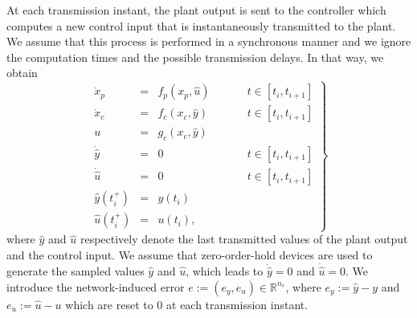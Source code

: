 \documentclass[a4paper, 9pt, twocolumn]{IEEEtran}
\theoremstyle{plain}
\theoremstyle{definition}
\newcommand{\R}[2]{\ensuremath{\mathbb{R}^{#1}_{#2}}}
\begin{document}
At each transmission instant, the plant output is sent to the controller which computes a new control input that is instantaneously transmitted to the plant. We assume that this process is performed in a synchronous manner and we ignore the computation times and the possible transmission delays. In that way, we obtain
\begin{equation}
\left.
  \begin{array}{rcll}
    \dot{x}_{p} &=& f_{p}(x_{p},\hat{u}) &\hspace{30pt}  t\in [t_{i}, t_{i+1}]\\
    \dot{x}_{c} &=& f_{c}(x_{c}, \hat{y}) &\hspace{30pt}  t\in [t_{i}, t_{i+1}]\\
    u &=& g_{c}(x_{c}, \hat{y}) \\
    \dot{\hat{y}} &=& 0 &\hspace{30pt}  t\in [t_{i}, t_{i+1}]\\
    \dot{\hat{u}} &=& 0 &\hspace{30pt}  t\in [t_{i}, t_{i+1}] \\
    \hat{y}(t_{i}^{+}) &=& y(t_{i}) \\
    \hat{u}(t_{i}^{+}) &=& u(t_{i}),
  \end{array}
\right \}
\end{equation}
\noindent where $\hat{y}$ and $\hat{u}$ respectively denote the last transmitted values of the plant output and the control input. We assume that zero-order-hold devices are used to generate the sampled values $\hat{y}$ and $\hat{u}$, which leads to  $\dot{\hat{y}} = 0$ and $\dot{\hat{u}} = 0$. We introduce the network-induced error $e := (e_{y}, e_{u}) \in \R{n_{e}}{}$, where $e_{y} := \hat{y} - y$ and $e_{u} := \hat{u} - u$ which are reset to $0$ at each transmission instant.
\end{document}
